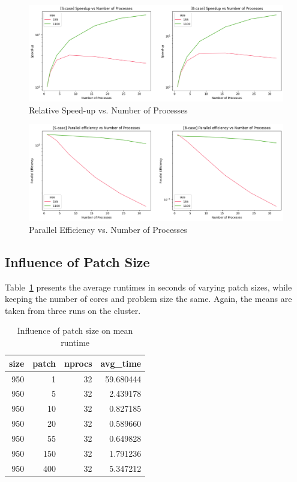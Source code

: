 \documentclass[a4paper,%
11pt,%
DIV12,
headsepline,%
headings=normal,
]{scrartcl}
\begin{document}
\begin{figure}[htb!]
    \centering
    \includegraphics[width=\textwidth]{nprocs-speedup.png}
    \caption{Relative Speed-up vs. Number of Processes}
    \label{fig:nprocs-speedup}
\end{figure}

\begin{figure}[htb!]
    \centering
    \includegraphics[width=\textwidth]{nprocs-parefficiency.png}
    \caption{Parallel Efficiency vs. Number of Processes}
    \label{fig:nprocs-parefficiency}
\end{figure}

\newpage
\clearpage
\subsection{Influence of Patch Size}

Table~\ref{tab:patch_size} presents the average runtimes in seconds of varying patch sizes, while keeping the number of cores and problem size the same. Again, the means are taken from three runs on the cluster. 

\begin{table}[h!]
\centering 
\caption{\label{tab:patch_size}Influence of patch size on mean runtime}
\begin{tabular}{rrrr}
\toprule
size & patch & nprocs & avg\_time \\
\midrule
950 & 1 & 32 & 59.680444 \\
950 & 5 & 32 & 2.439178 \\
950 & 10 & 32 & 0.827185 \\
950 & 20 & 32 & 0.589660 \\
950 & 55 & 32 & 0.649828 \\
950 & 150 & 32 & 1.791236 \\
950 & 400 & 32 & 5.347212 \\
\bottomrule
\end{tabular}
\end{table}
\end{document}
